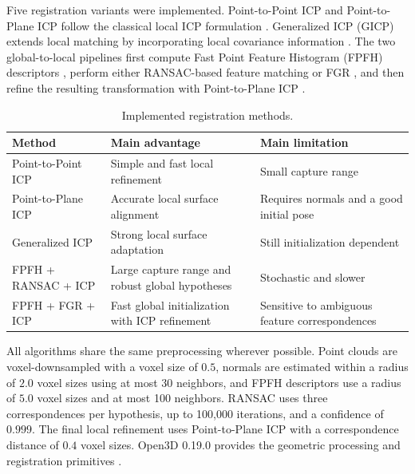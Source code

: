 Five registration variants were implemented. Point-to-Point ICP and Point-to-Plane ICP follow the classical local ICP formulation \cite{kraus_besl1992,kraus_chen1992}. Generalized ICP (GICP) extends local matching by incorporating local covariance information \cite{kraus_segal2009}. The two global-to-local pipelines first compute Fast Point Feature Histogram (FPFH) descriptors \cite{kraus_rusu2009}, perform either RANSAC-based feature matching or FGR \cite{kraus_zhou2016}, and then refine the resulting transformation with Point-to-Plane ICP \cite{kraus_lyu2024}.

\begin{table}[!t]
\centering
\footnotesize
\setlength{\tabcolsep}{3pt}
\begin{tabularx}{\columnwidth}{@{}lYY@{}}
\toprule
\textbf{Method} & \textbf{Main advantage} & \textbf{Main limitation} \\
\midrule
Point-to-Point ICP & Simple and fast local refinement & Small capture range \\
Point-to-Plane ICP & Accurate local surface alignment & Requires normals and a good initial pose \\
Generalized ICP & Strong local surface adaptation & Still initialization dependent \\
FPFH + RANSAC + ICP & Large capture range and robust global hypotheses & Stochastic and slower \\
FPFH + FGR + ICP & Fast global initialization with ICP refinement & Sensitive to ambiguous feature correspondences \\
\bottomrule
\end{tabularx}
\caption{Implemented registration methods.}
\label{tab:registration-methods}
\end{table}

All algorithms share the same preprocessing wherever possible. Point clouds are voxel-downsampled with a voxel size of $0.5$, normals are estimated within a radius of $2.0$ voxel sizes using at most 30 neighbors, and FPFH descriptors use a radius of $5.0$ voxel sizes and at most 100 neighbors. RANSAC uses three correspondences per hypothesis, up to 100,000 iterations, and a confidence of $0.999$. The final local refinement uses Point-to-Plane ICP with a correspondence distance of $0.4$ voxel sizes. Open3D 0.19.0 provides the geometric processing and registration primitives \cite{kraus_open3d019}.

